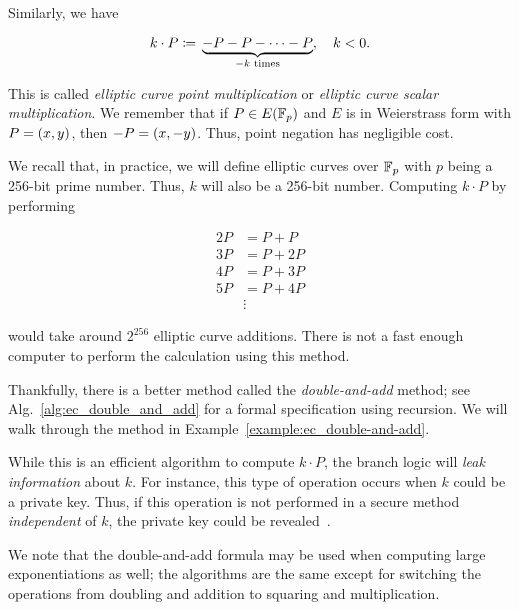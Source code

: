 \noindent
Similarly, we have

\begin{equation}
    k\cdot P \coloneqq{} 
        \underbrace{-P - P - \cdots - P}_{\text{$-k$ times}}, \quad k< 0.
\end{equation}

\noindent
This is called \emph{elliptic curve point multiplication} or
\emph{elliptic curve scalar multiplication}.
We remember that if $P\in E(\mathbb{F}_{p})$ and $E$ is in Weierstrass form
with $P = \left( x,y \right)$, then $-P = \left( x,-y \right)$.
Thus, point negation has negligible cost.

We recall that, in practice, we will define \glspl{elliptic curve} over
$\mathbb{F}_{p}$ with $p$ being a 256-bit prime number.
Thus, $k$ will also be a 256-bit number.
Computing $k\cdot P$ by performing

\begin{align}
    2P &= P + P  \nonumber\\
    3P &= P + 2P \nonumber\\
    4P &= P + 3P \nonumber\\
    5P &= P + 4P \nonumber\\
    &\vdots
\end{align}

\noindent
would take around $2^{256}$ elliptic curve additions.
There is not a fast enough computer to perform the calculation
using this method.

Thankfully, there is a better method called the \emph{double-and-add} method;
see Alg.~\ref{alg:ec_double_and_add} for a formal specification
using \gls{recursion}.
We will walk through the method in Example~\ref{example:ec_double-and-add}.



While this is an efficient algorithm to compute $k\cdot P$,
the branch logic will \emph{leak information} about $k$.
For instance, this type of operation occurs when $k$
could be a private key.
Thus, if this operation is not performed in a secure method
\emph{independent} of $k$, the private key could be
revealed~\cite{cryptoeprint:2014:140}.

We note that the double-and-add formula may be used
when computing large exponentiations as well;
the algorithms are the same except for switching the operations
from doubling and addition to squaring and multiplication.


